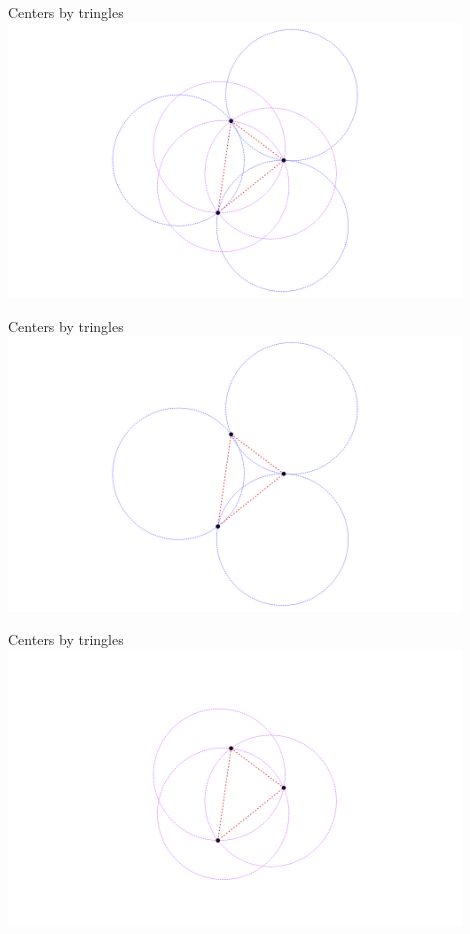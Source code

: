 \documentclass{beamer}
\begin{document}
\begin{frame}{Centers by tringles}
  \centering
  \includegraphics[width=0.9\textwidth]{figures/triangle1}
\end{frame}
\begin{frame}{Centers by tringles}
  \centering
  \includegraphics[width=0.9\textwidth]{figures/triangle2}
\end{frame}
\begin{frame}{Centers by tringles}
  \centering
  \includegraphics[width=0.9\textwidth]{figures/triangle3}
\end{frame}
\end{document}
